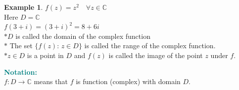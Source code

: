 \documentclass[11pt,a4paper]{article}
\theoremstyle{definition}
\newtheorem{example}[thm]{Example}
\begin{document}
\begin{example}
$f(z) = z^2 \quad  \forall z \in \mathbb{C}$\\

Here $D = \mathbb{C}$\\

$f(3 + i) = (3  + i)^2  = 8 + 6i$\\

$* D$ is called the domain of the complex function\\

$*$ The set $\{ f(z): \, z \in D\}$ is called the range of the complex function.\\

$* z \in  D$ is a point in $D$ and $f(z)$ is called the image of the point $z$ under $f$.
\end{example}

\textbf{\textcolor{teal}{Notation:}}\\
$f: D \longrightarrow \mathbb{C}$ means that $f$ is function (complex) with domain $D$.\\\\
\end{document}
